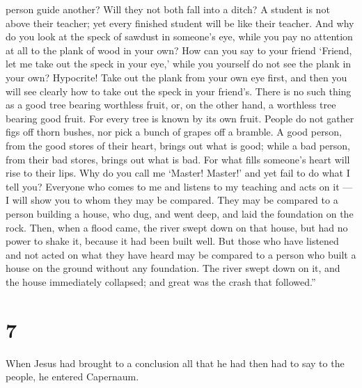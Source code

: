 person guide another? Will they not both fall into a ditch?
 A student is not above their teacher; yet every finished
student will be like their teacher.  And why do you look at
the speck of sawdust in someone's eye, while you pay no attention at all
to the plank of wood in your own?  How can you say to your
friend `Friend, let me take out the speck in your eye,' while you
yourself do not see the plank in your own? Hypocrite! Take out the plank
from your own eye first, and then you will see clearly how to take out
the speck in your friend's.  There is no such thing as a
good tree bearing worthless fruit, or, on the other hand, a worthless
tree bearing good fruit.  For every tree is known by its
own fruit. People do not gather figs off thorn bushes, nor pick a bunch
of grapes off a bramble.  A good person, from the good
stores of their heart, brings out what is good; while a bad person, from
their bad stores, brings out what is bad. For what fills someone's heart
will rise to their lips.  Why do you call me `Master!
Master!' and yet fail to do what I tell you?  Everyone who
comes to me and listens to my teaching and acts on it --- I will show
you to whom they may be compared.  They may be compared to
a person building a house, who dug, and went deep, and laid the
foundation on the rock. Then, when a flood came, the river swept down on
that house, but had no power to shake it, because it had been built
well.  But those who have listened and not acted on what
they have heard may be compared to a person who built a house on the
ground without any foundation. The river swept down on it, and the house
immediately collapsed; and great was the crash that followed.''

\hypertarget{section-5}{%
\section{7}\label{section-5}}

 When Jesus had brought to a conclusion all that he had then
had to say to the people, he entered Capernaum.

